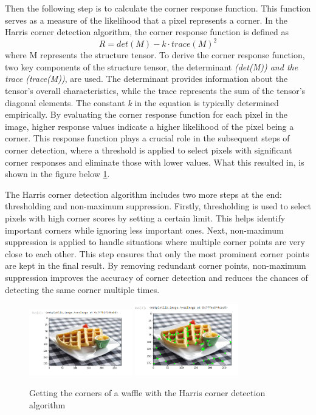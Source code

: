 Then the following step is to calculate the corner response function. This function serves as a measure of the likelihood that a pixel represents a corner. 
In the Harris corner detection algorithm, the corner response function is defined as
\begin{equation}
    \label{eqn:harris}
    R = det(M) - k \cdot trace(M)^2
\end{equation}
where M represents the structure tensor.
To derive the corner response function, two key components of the structure tensor, the determinant \emph{(det(M)) and the trace (trace(M))}, are used. 
The determinant provides information about the tensor's overall characteristics, while the trace represents the sum of the tensor's diagonal elements.
The constant \emph{k} in the equation is typically determined empirically.
By evaluating the corner response function for each pixel in the image, higher response values indicate a higher likelihood 
of the pixel being a corner. This response function plays a crucial role in the subsequent steps of corner detection, where a threshold is 
applied to select pixels with significant corner responses and eliminate those with lower values. What this resulted in, is shown in the figure below \ref{fig:harriscorner}.

The Harris corner detection algorithm includes two more steps at the end: thresholding and non-maximum suppression.
Firstly, thresholding is used to select pixels with high corner scores by setting a certain limit. 
This helps identify important corners while ignoring less important ones.
Next, non-maximum suppression is applied to handle situations where multiple corner points are very close to each other. 
This step ensures that only the most prominent corner points are kept in the final result. By removing redundant corner points, 
non-maximum suppression improves the accuracy of corner detection and reduces the chances of detecting the same corner multiple times. \cite{harristheory} \cite{harrisworks}
\\
\begin{figure}[htb]
    \centering
    \includegraphics[width=0.4\textwidth]{pics/HarrisWaffle.png}
    \includegraphics[width=0.4\textwidth]{pics/HarrisWaffle2.png}
    \caption{Getting the corners of a waffle with the Harris corner detection algorithm}
    \label{fig:harriscorner}
    \cite{waffleimage}
\end{figure}
\\

